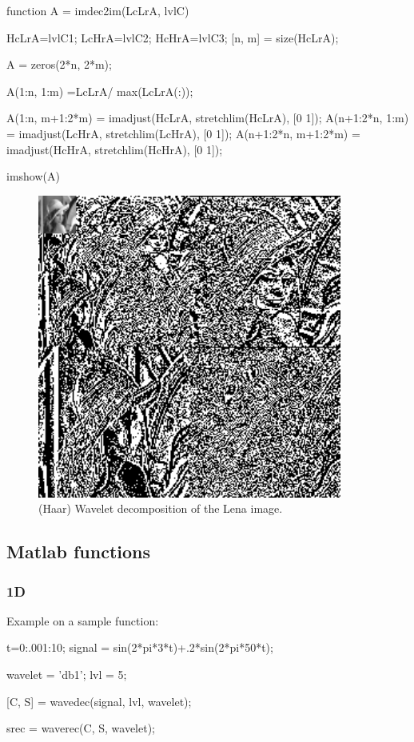 \begin{matlab}
function A = imdec2im(LcLrA, lvlC)
%

HcLrA=lvlC{1};
LcHrA=lvlC{2};
HcHrA=lvlC{3};
[n, m] = size(HcLrA);

A = zeros(2*n, 2*m);

A(1:n, 1:m) =LcLrA/ max(LcLrA(:));

A(1:n, m+1:2*m) = imadjust(HcLrA, stretchlim(HcLrA), [0 1]);
A(n+1:2*n, 1:m) = imadjust(LcHrA, stretchlim(LcHrA), [0 1]);
A(n+1:2*n, m+1:2*m) = imadjust(HcHrA, stretchlim(HcHrA), [0 1]);

imshow(A)
\end{matlab}


\begin{figure}[htbp]
 \centering
 \includegraphics[width=10cm]{lena_3lvl.png}
 \caption{(Haar) Wavelet decomposition of the Lena image.}
 \label{fig:wavelets:matlab:lena_lvl}
\end{figure}


\subsection{Matlab functions}

\subsubsection{1D}
Example on a sample function:
\begin{matlab}
t=0:.001:10;
signal = sin(2*pi*3*t)+.2*sin(2*pi*50*t);

wavelet = 'db1'; %
lvl = 5; %

[C, S] = wavedec(signal, lvl, wavelet);

srec = waverec(C, S, wavelet);
\end{matlab}


